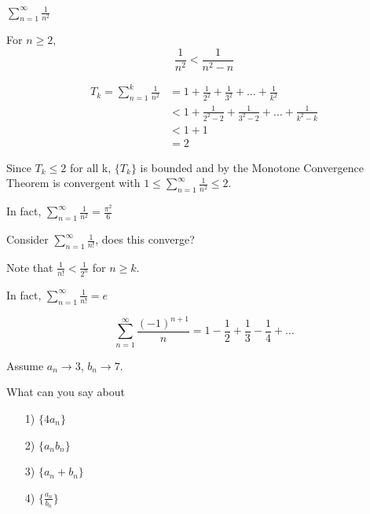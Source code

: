 \begin{exmp}
$\displaystyle\sum_{n=1}^\infty \frac{1}{n^2}$
\end{exmp}

\begin{note}
For $n\geq 2$, $$\frac{1}{n^2}< \frac{1}{n^2-n}$$
\end{note}

\begin{align*}
    T_k = \sum_{n=1}^k \frac{1}{n^2} &= 1+ \frac{1}{2^2}+ \frac{1}{3^2}+\dots + \frac{1}{k^2}\\
    &< 1 + \frac{1}{2^2-2}+ \frac{1}{3^2-2}+\dots + \frac{1}{k^2-k}\\
    &< 1 + 1\\
    &= 2
\end{align*}

Since $T_k\leq 2$ for all k, $\{T_k\}$ is bounded and by the Monotone Convergence Theorem is convergent with $\displaystyle 1\leq\sum_{n=1}^\infty \frac{1}{n^2}\leq 2 $.

In fact, $\displaystyle\sum_{n=1}^\infty \frac{1}{n^2} = \frac{\pi^2}{6}$


\begin{exmp}
Consider $\displaystyle\sum_{n=1}^\infty \frac{1}{n!}$, does this converge?
\end{exmp}

Note that $\displaystyle\frac{1}{n!}<\frac{1}{2^n}$ for $n\geq k$.

In fact, $\displaystyle\sum_{n=1}^\infty \frac{1}{n!} = e$


\begin{note}
$$\sum_{n=1}^\infty \frac{(-1)^{n+1}}{n} =1 -  \frac{1}{2}+\frac{1}{3}-\frac{1}{4}+\dots$$
\end{note} 



\begin{ques}
Assume $a_n\to 3$, $b_n\to 7$.

What can you say about

\begin{enumerate}
\item[1)] $\{4a_n\}$
\item[2)] $\{a_nb_n\}$
\item[3)] $\{a_n+b_n\}$
\item[4)] $\displaystyle\{\frac{a_n}{b_n}\}$
\end{enumerate}

\end{ques}

